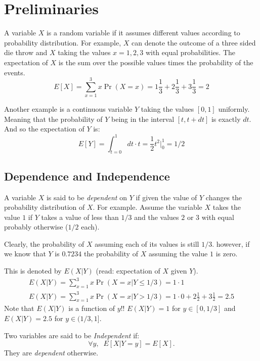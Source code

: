 \documentclass{article}
\begin{document}


\section{Preliminaries}
A variable $X$ is a random variable if it assumes different values
according to probability distribution. For example, $X$ can 
denote the outcome of a three sided die throw and $X$ taking the values $x
= 1,2,3$ with equal probabilities. The
expectation of $X$ is the sum over the possible values times the
probability of the events.
\begin{equation}
E[X] = \sum_{x=1}^{3}x \Pr(X = x)=
1\frac{1}{3}+2\frac{1}{3}+3\frac{1}{3} = 2
\end{equation}

Another example is a continuous variable $Y$ taking the values
$[0,1]$ uniformly. Meaning that the probability of $Y$ being in the
interval $[t,t + dt]$ is exactly $dt$. And so the expectation of $Y$
is:
\begin{equation}
E[Y] = \int_{t=0}^{1}dt \cdot t = \frac{1}{2}t^2|_{0}^{1} = 1/2
\end{equation}


\subsection{Dependence and Independence}
A variable $X$ is said to be {\it dependent} on $Y$ if given the
value of $Y$ changes the probability distribution of $X$. For
example. Assume the variable $X$ takes the value $1$ if $Y$ takes a
value of less than $1/3$ and the values $2$ or $3$ with equal
probably otherwise ($1/2$ each).

Clearly, the probability of $X$ assuming each of its values is still
$1/3$. however, if we know that $Y$ is $0.7234$ the probability of
$X$ assuming the value $1$ is zero.

This is denoted by $E(X | Y)$ (read: expectation of $X$ given $Y$).
\begin{eqnarray}
E(X | Y) = \sum_{x=1}^{3} x \Pr(X = x | Y \le 1/3) = 1\cdot 1\\
E(X | Y) = \sum_{x=1}^{3} x \Pr(X = x | Y > 1/3) = 1\cdot 0 + 2
\frac{1}{2} + 3\frac{1}{2}  = 2.5
\end{eqnarray}
Note that $E(X | Y)$ is a function of $y$!! $E(X | Y) = 1$ for $y
\in [0,1/3]$ and $E(X | Y) = 2.5$ for $y \in (1/3,1]$.

\begin{definition}
Two variables are said to be {\it Independent} if:
\[
\forall y,\;\;E[ X | Y = y] = E[X].
\]
They are {\it dependent} otherwise.
\end{definition}
\end{document}
